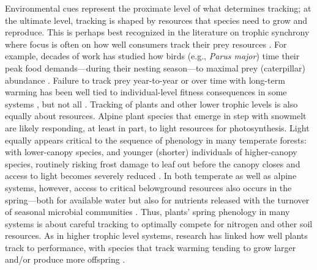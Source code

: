 \documentclass[11pt,letterpaper]{article}
\begin{document}
Environmental cues represent the proximate level of what determines tracking; at the ultimate level, tracking is shaped by resources that species need to grow and reproduce. This is perhaps best recognized in the literature on trophic synchrony where focus is often on how well consumers track their prey resources \citep{deacy2018,kharouba2018}. For example, decades of work has studied how birds (e.g., \emph{Parus major}) time their peak food demands---during their nesting season---to maximal prey (caterpillar) abundance \citep[e.g.,][]{charm2008}. Failure to track prey year-to-year or over time with long-term warming has been well tied to individual-level fitness consequences in some systems \citep{charm2008}, but not all \citep{visser2006}. Tracking of plants and other lower trophic levels is also equally about resources. Alpine plant species that emerge in step with snowmelt are likely responding, at least in part, to light resources for photosynthesis. Light equally appears critical to the sequence of phenology in many temperate forests: with lower-canopy species, and younger (shorter) individuals of higher-canopy species, routinely risking frost damage to leaf out before the canopy closes and access to light becomes severely reduced \citep{Vitasse2013,heberling2019}. In both temperate as well as alpine systems, however, access to critical belowground resources also occurs in the spring---both for available water but also for nutrients released with the turnover of seasonal microbial communities \citep{Zak:1990ar,edwards2010N}. Thus, plants' spring phenology in many systems is about careful tracking to optimally compete for nitrogen and other soil resources. As in higher trophic level systems, research has linked how well plants track to performance, with species that track warming tending to grow larger and/or produce more offspring \citep{Cleland:2012}.
\end{document}
